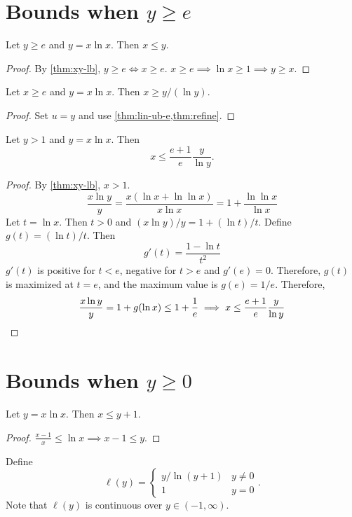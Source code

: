 \section{Bounds when \texorpdfstring{$y \ge e$}{y >= e}}

\begin{theorem}
\label{thm:lin-ub-e}
Let $y \ge e$ and $y = x\ln x$. Then $x \le y$.
\end{theorem}
\begin{proof}
By \cref{thm:xy-lb}, $y \ge e \iff x \ge e$.
$x \ge e \implies \ln x \ge 1 \implies y \ge x$.
\end{proof}

\begin{theorem}
Let $x \ge e$ and $y = x\ln x$. Then $x \ge y/(\ln y)$.
\end{theorem}
\begin{proof}
Set $u = y$ and use \cref{thm:lin-ub-e,thm:refine}.
\end{proof}

\begin{theorem}
Let $y > 1$ and $y = x\ln x$. Then
\[ x \le \frac{e+1}{e} \frac{y}{\ln y}. \]
\end{theorem}
\begin{proof}
By \cref{thm:xy-lb}, $x > 1$.
\[ \frac{x\ln y}{y}
= \frac{x(\ln x + \ln\ln x)}{x\ln x}
= 1 + \frac{\ln\ln x}{\ln x} \]
Let $t = \ln x$. Then $t > 0$ and $(x\ln y)/y = 1 + (\ln t)/t$.
Define $g(t) = (\ln t)/t$. Then
\[ g'(t) = \frac{1 - \ln t}{t^2} \]
$g'(t)$ is positive for $t < e$, negative for $t > e$ and $g'(e) = 0$.
Therefore, $g(t)$ is maximized at $t = e$, and the maximum value is $g(e) = 1/e$.
Therefore,
\[ \frac{x\ln y}{y} = 1 + g(\ln x) \le 1 + \frac{1}{e}
\implies x \le \frac{e+1}{e} \frac{y}{\ln y}  \qedhere \]
\end{proof}

\section{Bounds when \texorpdfstring{$y \ge 0$}{y >= 0}}

\begin{theorem}
\label{thm:lin-ub}
Let $y = x\ln x$. Then $x \le y + 1$.
\end{theorem}
\begin{proof}
$\frac{x-1}{x} \le \ln x \implies x-1 \le y$.
\end{proof}

Define
\[ \ell(y) = \begin{cases} y/\ln(y+1) & y \neq 0
\\ 1 & y = 0 \end{cases}. \]
Note that $\ell(y)$ is continuous over $y \in (-1, \infty)$.

